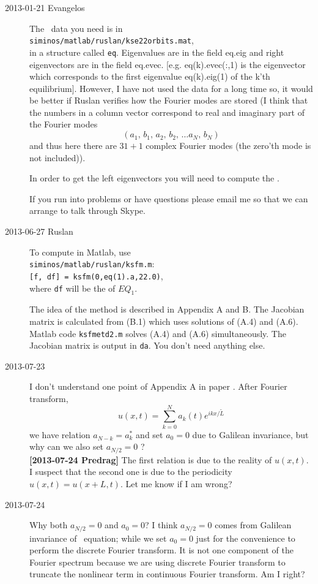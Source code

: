 \begin{description}
\item[2013-01-21 Evangelos] The \KS\ data you need is in \\
\texttt{siminos/matlab/ruslan/kse22orbits.mat},
\\
in a structure called \texttt{eq}.
Eigenvalues are in the field eq.eig and right
eigenvectors are in the field eq.evec. [e.g. eq(k).evec(:,1) is the
eigenvector which corresponds to the first eigenvalue eq(k).eig(1) of
the k'th equilibrium]. However, I have not used the data for a long
time so, it would be better if Ruslan verifies how the Fourier modes
are stored (I think that the numbers in a column vector correspond to
real and imaginary part of the Fourier modes
\[
 (a_1,\, b_1,\, a_2,\, b_2,\, \ldots a_N,\, b_N)
\]
and thus here there are $31+1$ complex Fourier modes (the zero'th mode
is not included)).

In order to get the left eigenvectors you will need to compute the
{\stabmat}.

If you run into problems or have questions please email me so that we
can arrange to talk through Skype.


\item[2013-06-27 Ruslan] To compute {\stabmat} in Matlab, use
\\
\texttt{siminos/matlab/ruslan/ksfm.m}:
\\ {\tt [f, df] = ksfm(0,eq(1).a,22.0)},
\\where {\tt df} will be the {\stabmat} of $EQ_1$.

The idea of the method is described in  Appendix A and
B.  The Jacobian matrix is calculated from (B.1) which uses solutions
of (A.4) and (A.6).  Matlab code {\tt ksfmetd2.m} solves (A.4) and
(A.6) simultaneously.  The Jacobian matrix is output in {\tt da}.
You don't need anything else.


\item[2013-07-23 \XD] I don't understand one point of Appendix A in
    paper . After Fourier transform,
\[
 u(x,t)=\sum_{k=0}^{N} a_{k}(t)e^{ikx/\tilde{L}}
\]
we have relation $a_{N-k}^{~}=a_{k}^{*}$ and set $a_0=0$ due to Galilean
invariance, but why can we also set $a_{N/2}=0$ ?
\\
{\bf [2013-07-24 Predrag]} The first relation is due to the reality of
\( u(x,t) \). I suspect that the second one is due to the periodicity
\( u(x,t) = u(x+L,t) \). Let me know if I am wrong?

\item[2013-07-24  \XD] Why both $a_{N/2}=0$ and $a_0=0$? I think
    $a_{N/2}=0$ comes from Galilean invariance of \KS\ equation; while
    we set $a_0=0$ just for the convenience to perform the discrete
    Fourier transform. It is not one component of the Fourier spectrum
    because we are using discrete Fourier transform to truncate the
    nonlinear term in continuous Fourier transform. Am I right?


\end{description}
